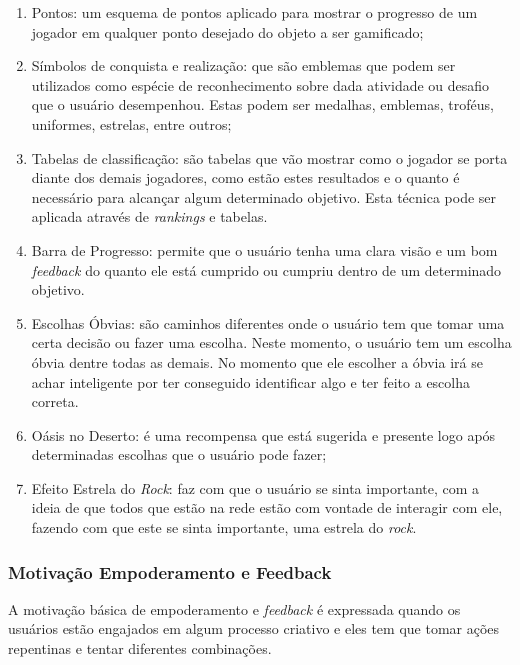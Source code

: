 \begin{enumerate}
    \item Pontos: um esquema de pontos aplicado para mostrar o progresso
        de um jogador em qualquer ponto desejado do objeto a ser gamificado;
    \item Símbolos de conquista e realização: que são emblemas que podem
        ser utilizados como espécie de reconhecimento sobre dada
        atividade ou desafio que o usuário desempenhou. Estas podem ser
        medalhas, emblemas, troféus, uniformes, estrelas, entre outros;
    \item Tabelas de classificação: são tabelas que vão mostrar como o
        jogador se porta diante dos demais jogadores, como
        estão estes resultados e o quanto é necessário para alcançar
        algum determinado objetivo. Esta técnica pode ser aplicada através
        de \textit{rankings} e tabelas.
    \item Barra de Progresso: permite que o usuário tenha uma clara visão
        e um bom \textit{feedback} do quanto ele está cumprido ou cumpriu dentro
        de um determinado objetivo.
    \item Escolhas Óbvias: são caminhos diferentes onde o usuário tem que tomar
        uma certa decisão ou fazer uma escolha. Neste momento, o usuário tem um
        escolha óbvia dentre todas as demais. No momento que ele escolher a óbvia
        irá se achar inteligente por ter conseguido identificar algo e ter
        feito a escolha correta.
    \item Oásis no Deserto: é uma recompensa que está sugerida e presente logo
        após determinadas escolhas que o usuário pode fazer;
    \item Efeito Estrela do \textit{Rock}: faz com que o usuário se sinta importante,
        com a ideia de que todos que estão na rede estão com vontade de interagir
        com ele, fazendo com que este se sinta importante, uma estrela do \textit{rock}.
\end{enumerate}

\subsubsection{Motivação Empoderamento e Feedback}
\label{sub:empoderamentoefeedback}
A motivação básica de empoderamento e \textit{feedback} é expressada quando os usuários
estão engajados em algum processo criativo e eles tem que tomar ações repentinas
e tentar diferentes combinações.

